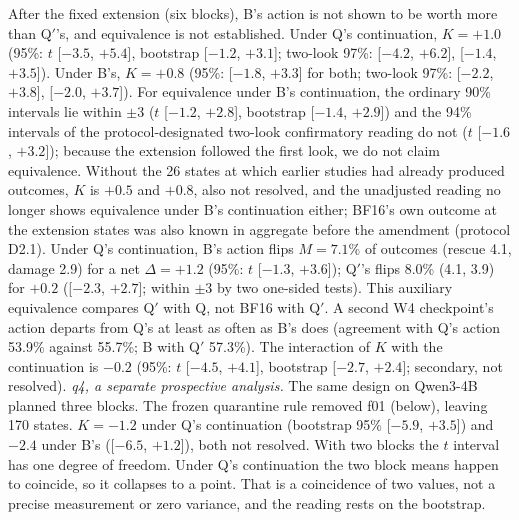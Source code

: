After the fixed extension (six blocks), B's action is not shown to be worth more than Q$'$'s, and equivalence is not established. Under Q's continuation, $K=+1.0$\pp{} (95\%: $t$ [$-3.5$, $+5.4$], bootstrap [$-1.2$, $+3.1$]; two-look 97\%: [$-4.2$, $+6.2$], [$-1.4$, $+3.5$]). Under B's, $K=+0.8$\pp{} (95\%: [$-1.8$, $+3.3$] for both; two-look 97\%: [$-2.2$, $+3.8$], [$-2.0$, $+3.7$]). For equivalence under B's continuation, the ordinary 90\% intervals lie within $\pm$3\pp{} ($t$ [$-1.2$, $+2.8$], bootstrap [$-1.4$, $+2.9$]) and the 94\% intervals of the protocol-designated two-look confirmatory reading do not ($t$ [$-1.6$, $+3.2$]); because the extension followed the first look, we do not claim equivalence. Without the 26 states at which earlier studies had already produced outcomes, $K$ is $+0.5$ and $+0.8$\pp{}, also not resolved, and the unadjusted reading no longer shows equivalence under B's continuation either; BF16's own outcome at the extension states was also known in aggregate before the amendment (protocol D2.1). %
Under Q's continuation, B's action flips $M=7.1$\% of outcomes (rescue 4.1, damage 2.9) for a net $\Delta=+1.2$\pp{} (95\%: $t$ [$-1.3$, $+3.6$]); Q$'$'s flips 8.0\% (4.1, 3.9) for $+0.2$\pp{} ([$-2.3$, $+2.7$]; within $\pm$3\pp{} by two one-sided tests). This auxiliary equivalence compares Q$'$ with Q, not BF16 with Q$'$. A second W4 checkpoint's action departs from Q's at least as often as B's does (agreement with Q's action 53.9\% against 55.7\%; B with Q$'$ 57.3\%). The interaction of $K$ with the continuation is $-0.2$\pp{} (95\%: $t$ [$-4.5$, $+4.1$], bootstrap [$-2.7$, $+2.4$]; secondary, not resolved). %
\emph{q4, a separate prospective analysis.} The same design on Qwen3-4B planned three blocks. The frozen quarantine rule removed f01 (below), leaving 170 states. $K=-1.2$\pp{} under Q's continuation (bootstrap 95\% [$-5.9$, $+3.5$]) and $-2.4$\pp{} under B's ([$-6.5$, $+1.2$]), both not resolved. With two blocks the $t$ interval has one degree of freedom. Under Q's continuation the two block means happen to coincide, so it collapses to a point. That is a coincidence of two values, not a precise measurement or zero variance, and the reading rests on the bootstrap. %
